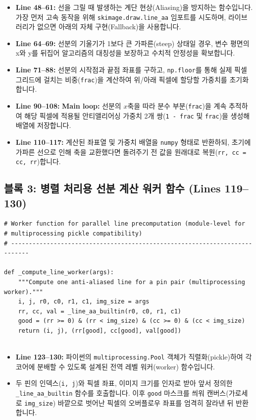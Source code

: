 \begin{itemize}
\item \textbf{Line 48--61:} 선을 그릴 때 발생하는 계단 현상(Aliasing)을 방지하는 함수입니다. 가장 먼저 고속 동작을 위해 \texttt{skimage.draw.line\_aa} 임포트를 시도하며, 라이브러리가 없으면 아래의 자체 구현(Fallback)을 사용합니다.
\item \textbf{Line 64--69:} 선분의 기울기가 1보다 큰 가파른(steep) 상태일 경우, 변수 평면의 x와 y를 뒤집어 알고리즘의 대칭성을 보장하고 수치적 안정성을 확보합니다. 
\item \textbf{Line 71--88:} 선분의 시작점과 끝점 좌표를 구하고, \texttt{np.floor}를 통해 실제 픽셀 그리드에 걸치는 비중(\texttt{frac})을 계산하여 위/아래 픽셀에 할당할 가중치를 초기화합니다.
\item \textbf{Line 90--108:} \textbf{Main loop:} 선분의 \(x\)축을 따라 분수 부분(\texttt{frac})을 계속 추적하여 해당 픽셀에 적용될 안티앨리어싱 가중치 2개 쌍(\texttt{1 - frac} 및 \texttt{frac})을 생성해 배열에 저장합니다.
\item \textbf{Line 110--117:} 계산된 좌표열 및 가중치 배열을 \texttt{numpy} 형태로 반환하되, 초기에 가파른 선으로 인해 축을 교환했다면 돌려주기 전 값을 원래대로 복원(\texttt{rr, cc = cc, rr})합니다.
\end{itemize}

\subsection*{블록 3: 병렬 처리용 선분 계산 워커 함수 (Lines 119--130)}
\begin{lstlisting}[firstnumber=119]
# Worker function for parallel line precomputation (module-level for
# multiprocessing pickle compatibility)
# ---------------------------------------------------------------------------

def _compute_line_worker(args):
    """Compute one anti-aliased line for a pin pair (multiprocessing worker)."""
    i, j, r0, c0, r1, c1, img_size = args
    rr, cc, val = _line_aa_builtin(r0, c0, r1, c1)
    good = (rr >= 0) & (rr < img_size) & (cc >= 0) & (cc < img_size)
    return (i, j), (rr[good], cc[good], val[good])


\end{lstlisting}
\begin{itemize}
\item \textbf{Line 123--130:} 파이썬의 \texttt{multiprocessing.Pool} 객체가 직렬화(pickle)하여 각 코어에 분배할 수 있도록 설계된 전역 레벨 워커(worker) 함수입니다. 
\item 두 핀의 인덱스(\texttt{i, j})와 픽셀 좌표, 이미지 크기를 인자로 받아 앞서 정의한 \texttt{\_line\_aa\_builtin} 함수를 호출합니다. 이후 \texttt{good} 마스크를 씌워 캔버스(가로세로 \texttt{img\_size}) 바깥으로 벗어난 픽셀의 오버플로우 좌표를 엄격히 잘라낸 뒤 반환합니다.
\end{itemize}

